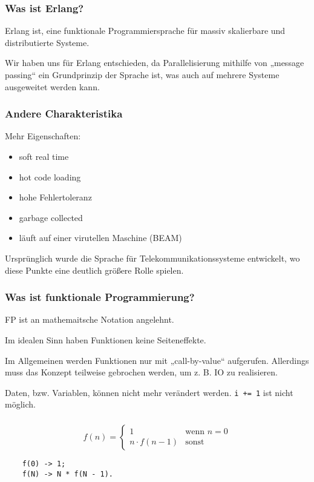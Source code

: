 \documentclass[compress]{beamer}
\begin{document}
\begin{frame}
  \frametitle{Was ist Erlang?}

  Erlang ist, eine funktionale Programmiersprache für massiv
  skalierbare und distributierte Systeme.

  Wir haben uns für Erlang entschieden, da Parallelisierung mithilfe
  von „message passing“ ein Grundprinzip der Sprache ist, was auch auf
  mehrere Systeme ausgeweitet werden kann.
\end{frame}

\begin{frame}
  \frametitle{Andere Charakteristika}

  Mehr Eigenschaften:

  \begin{itemize}
  \item soft real time
  \item hot code loading
  \item hohe Fehlertoleranz
  \item garbage collected
  \item läuft auf einer virutellen Maschine (BEAM)
  \end{itemize}

  Ursprünglich wurde die Sprache für Telekommunikationssysteme
  entwickelt, wo diese Punkte eine deutlich größere Rolle spielen.
\end{frame}

\begin{frame}
  \frametitle{Was ist funktionale Programmierung?}

  FP ist an mathemaitsche Notation angelehnt.

  Im idealen Sinn haben Funktionen keine Seiteneffekte.

  Im Allgemeinen werden Funktionen nur mit „call-by-value“ aufgerufen.
  Allerdings muss das Konzept teilweise gebrochen werden, um z. B. IO
  zu realisieren.

  Daten, bzw. Variablen, können nicht mehr verändert
  werden. \lstinline{i += 1} ist nicht möglich. %


\end{frame}

\begin{frame}[fragile]
  \frametitle{}
  $$
  f(n) =
  \begin{cases}
    1             &\textrm{wenn } n = 0 \\
    n \cdot f(n - 1) & \textrm{sonst}
  \end{cases}
  $$
  \vfill

  \begin{lstlisting}
    f(0) -> 1;
    f(N) -> N * f(N - 1).
  \end{lstlisting}
\end{frame}
\end{document}
